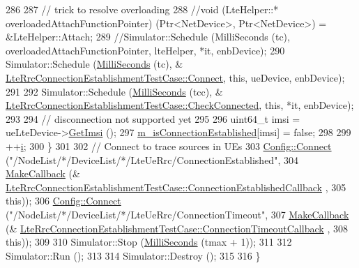 \begin{DoxyCode}
286 
287       \textcolor{comment}{// trick to resolve overloading}
288       \textcolor{comment}{//void (LteHelper::* overloadedAttachFunctionPointer) (Ptr<NetDevice>, Ptr<NetDevice>) =
       &LteHelper::Attach;}
289       \textcolor{comment}{//Simulator::Schedule (MilliSeconds (tc), overloadedAttachFunctionPointer, lteHelper, *it,
       enbDevice);}
290       Simulator::Schedule (\hyperlink{group__timecivil_gaf26127cf4571146b83a92ee18679c7a9}{MilliSeconds} (tc), &
      \hyperlink{classLteRrcConnectionEstablishmentTestCase_acc46d31ee3a048f2d0a4b55a8c93f0de}{LteRrcConnectionEstablishmentTestCase::Connect}, \textcolor{keyword}{this}, 
      ueDevice, enbDevice);
291 
292       Simulator::Schedule (\hyperlink{group__timecivil_gaf26127cf4571146b83a92ee18679c7a9}{MilliSeconds} (tcc), &
      \hyperlink{classLteRrcConnectionEstablishmentTestCase_a43216a40683fd19ad571edd9d0e8600c}{LteRrcConnectionEstablishmentTestCase::CheckConnected},
       \textcolor{keyword}{this}, *it, enbDevice);
293 
294       \textcolor{comment}{// disconnection not supported yet}
295 
296       uint64\_t imsi = ueLteDevice->\hyperlink{classns3_1_1LteUeNetDevice_a673405bfed4b45c5714f17b0c3bad334}{GetImsi} ();
297       \hyperlink{classLteRrcConnectionEstablishmentTestCase_a1516a2a155242462521febbc223b6cfb}{m\_isConnectionEstablished}[imsi] = \textcolor{keyword}{false};
298 
299       ++\hyperlink{bernuolliDistribution_8m_a6f6ccfcf58b31cb6412107d9d5281426}{i};
300     \}
301 
302   \textcolor{comment}{// Connect to trace sources in UEs}
303   \hyperlink{group__config_ga4014f151241cd0939b6cb64409605736}{Config::Connect} (\textcolor{stringliteral}{"/NodeList/*/DeviceList/*/LteUeRrc/ConnectionEstablished"},
304                    \hyperlink{group__makecallbackmemptr_ga9376283685aa99d204048d6a4b7610a4}{MakeCallback} (&
      \hyperlink{classLteRrcConnectionEstablishmentTestCase_a39f38708e4239b1c704c2cc094cbf360}{LteRrcConnectionEstablishmentTestCase::ConnectionEstablishedCallback}
      ,
305                                  \textcolor{keyword}{this}));
306   \hyperlink{group__config_ga4014f151241cd0939b6cb64409605736}{Config::Connect} (\textcolor{stringliteral}{"/NodeList/*/DeviceList/*/LteUeRrc/ConnectionTimeout"},
307                    \hyperlink{group__makecallbackmemptr_ga9376283685aa99d204048d6a4b7610a4}{MakeCallback} (&
      \hyperlink{classLteRrcConnectionEstablishmentTestCase_a4303d989d12748bb5f5e405b787f11f2}{LteRrcConnectionEstablishmentTestCase::ConnectionTimeoutCallback}
      ,
308                                  \textcolor{keyword}{this}));
309 
310   Simulator::Stop (\hyperlink{group__timecivil_gaf26127cf4571146b83a92ee18679c7a9}{MilliSeconds} (tmax + 1));
311 
312   Simulator::Run ();
313 
314   Simulator::Destroy ();
315 
316 \}
\end{DoxyCode}


